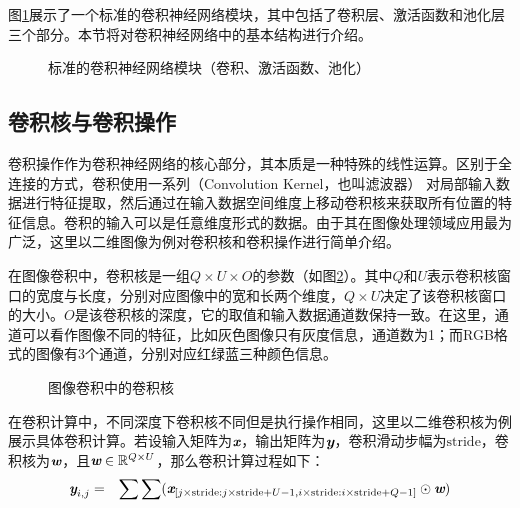 \parinterval 图\ref{fig:11-2}展示了一个标准的卷积神经网络模块，其中包括了卷积层、激活函数和池化层三个部分。本节将对卷积神经网络中的基本结构进行介绍。

\begin{figure}[htp]
\centering

\caption{标准的卷积神经网络模块（卷积、激活函数、池化）}
\label{fig:11-2}
\end{figure}


\subsection{卷积核与卷积操作}

\parinterval 卷积操作作为卷积神经网络的核心部分，其本质是一种特殊的线性运算。区别于全连接的方式，卷积使用一系列{\small{}}（Convolution Kernel，也叫滤波器） 对局部输入数据进行特征提取，然后通过在输入数据空间维度上移动卷积核来获取所有位置的特征信息。卷积的输入可以是任意维度形式的数据。由于其在图像处理领域应用最为广泛，这里以二维图像为例对卷积核和卷积操作进行简单介绍。

\parinterval 在图像卷积中，卷积核是一组$Q \times U \times O$的参数（如图\ref{fig:11-3}）。其中$Q$和$U$表示卷积核窗口的宽度与长度，分别对应图像中的宽和长两个维度，$Q \times U$决定了该卷积核窗口的大小。$O$是该卷积核的深度，它的取值和输入数据通道数保持一致。在这里，通道可以看作图像不同的特征，比如灰色图像只有灰度信息，通道数为1；而RGB格式的图像有3个通道，分别对应红绿蓝三种颜色信息。

\begin{figure}[htp]
\centering

\caption{图像卷积中的卷积核}
\label{fig:11-3}
\end{figure}

\parinterval 在卷积计算中，不同深度下卷积核不同但是执行操作相同，这里以二维卷积核为例展示具体卷积计算。若设输入矩阵为$\textbf{\em x}$，输出矩阵为$\textbf{\em y}$，卷积滑动步幅为$\textrm{stride}$，卷积核为$\textbf{\em w}$，且$\textbf{\em w} \in \mathbb{R}^{Q \times U} $，那么卷积计算过程如下：
\begin{eqnarray}
\textbf{\em y}_{i,j} &=& \sum \sum ( \textbf{\em x}_{[j\times \textrm{stride}:j\times \textrm{stride}+U-1,i\times \textrm{stride}:i\times \textrm{stride}+Q-1]} \odot \textbf{\em w} )
\label{eq:11-1}
\end{eqnarray}

